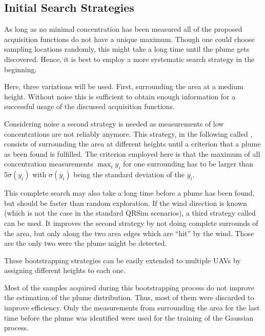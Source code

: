 \subsection{Initial Search Strategies}\label{sec:bootstrapping}
As long as no minimal concentration has been measured all of the proposed 
acquisition functions do not have a unique maximum. Though one could choose 
sampling locations randomly, this might take a long time until the plume gets 
discovered.  Hence, it is best to employ a more systematic search strategy in 
the beginning.

Here, three variations will be used. First, surrounding the area at a medium 
height.  Without noise this is sufficient to obtain enough information for 
a successful usage of the discussed acquisition functions.

Considering noise a second strategy is needed as measurements of low 
concentrations are not reliably anymore. This strategy, in the following called 
, consists of surrounding the area at different heights 
until a criterion that a plume as been found is fulfilled. The criterion 
employed here is that the maximum of all concentration measurements $\max_i y_i$ 
for one surrounding has to be larger than $5\sigma(y_i)$ with $\sigma(y_i)$ 
being the standard deviation of the $y_i$.

This complete search may also take a long time before a plume has been found, 
but should be faster than random exploration. If the wind direction is known 
(which is not the case in the standard QRSim scenarios), a third strategy called 
 can be used.  It improves the second strategy by not 
doing complete surrounds of the area, but only along the two area edges which 
are ``hit'' by the wind.  Those are the only two were the plume might be 
detected.

These bootstrapping strategies can be easily extended to multiple UAVs by 
assigning different heights to each one.

Most of the samples acquired during this bootstrapping process do not improve 
the estimation of the plume distribution. Thus, most of them were discarded to 
improve efficiency.  Only the measurements from surrounding the area for the 
last time before the plume was identified were used for the training of the 
Gaussian process.

